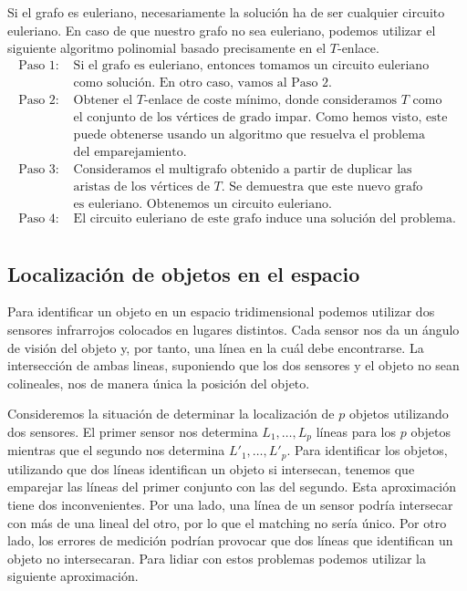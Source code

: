 \documentclass[twoside,a4paper,openright,12pt]{book}
\begin{document}
Si el grafo es euleriano, necesariamente la solución ha de ser cualquier circuito euleriano. En caso de que nuestro grafo no sea euleriano, podemos utilizar el siguiente algoritmo polinomial basado precisamente en el $T$-enlace.
\begin{align*}
\text{Paso 1: }& \text{Si el grafo es euleriano, entonces tomamos un circuito euleriano}\\
&\text{como solución. En otro caso, vamos al Paso 2.}\\
\text{Paso 2: }&\text{Obtener el $T$-enlace de coste mínimo, donde consideramos $T$ como}\\
&\text{el conjunto de los vértices de grado impar. Como hemos visto, este}\\
&\text{puede obtenerse usando un algoritmo que resuelva el problema}\\
&\text{del emparejamiento.}\\
\text{Paso 3: }&\text{Consideramos el multigrafo obtenido a partir de duplicar las}\\
&\text{aristas de los vértices de $T$. Se demuestra que este nuevo grafo}\\
&\text{es euleriano. Obtenemos un circuito euleriano.}\\
\text{Paso 4: }& \text{El circuito euleriano de este grafo induce una solución del problema.}\\
\end{align*} 

\subsection{Localización de objetos en el espacio}
Para identificar un objeto en un espacio tridimensional podemos utilizar dos sensores infrarrojos colocados en lugares distintos. Cada sensor nos da un ángulo de visión del objeto y, por tanto, una línea en la cuál debe encontrarse. La intersección de ambas lineas, suponiendo que los dos sensores y el objeto no sean colineales, nos de manera única la posición del objeto. 

Consideremos la situación de determinar la localización de $p$ objetos utilizando dos sensores. El primer sensor nos determina $L_1,\dotsc,L_p$ líneas para los $p$ objetos mientras que el segundo nos determina $L'_1,\dotsc,L'_p$. Para identificar los objetos, utilizando que dos líneas identifican un objeto si intersecan, tenemos que emparejar las líneas del primer conjunto con las del segundo. Esta aproximación tiene dos inconvenientes. Por una lado, una línea de un sensor podría intersecar con más de una lineal del otro, por lo que el matching no sería único. Por otro lado, los errores de medición podrían provocar que dos líneas que identifican un objeto no intersecaran. Para lidiar con estos problemas podemos utilizar la siguiente aproximación. 
\end{document}
